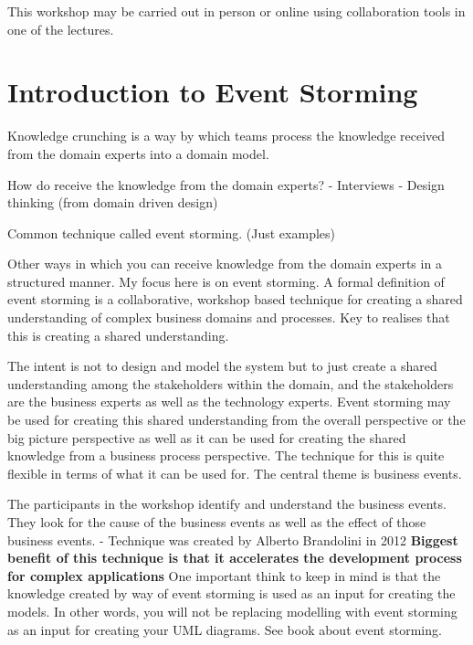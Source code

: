 \documentclass[a4paper, 11pt]{book}
\begin{document}
    This workshop may be carried out in person or online using collaboration tools in one of the lectures.


    \section{Introduction to Event Storming}

    Knowledge crunching is a way by which teams process the knowledge received from the domain experts into a domain model.

    How do receive the knowledge from the domain experts?
    - Interviews
    - Design thinking (from domain driven design)

    Common technique called event storming. (Just examples)

    Other ways in which you can receive knowledge from the domain experts in a structured manner.
    My focus here is on event storming.
    A formal definition of event storming is a collaborative, workshop based technique for creating a shared understanding of complex business domains and processes.
    Key to realises that this is creating a shared understanding.

    The intent is not to design and model the system but to just create a shared understanding among the stakeholders within the domain, and the stakeholders are the business experts as well as the technology experts.
    Event storming may be used for creating this shared understanding from the overall perspective or the big picture perspective as well as it can be used for creating the shared knowledge from a business process perspective.
    The technique for this is quite flexible in terms of what it can be used for.
    The central theme is business events.

    The participants in the workshop identify and understand the business events.
    They look for the cause of the business events as well as the effect of those business events.
    - Technique was created by Alberto Brandolini in 2012 %
    \textbf{Biggest benefit of this technique is that it accelerates the development process for complex applications}
    One important think to keep in mind is that the knowledge created by way of event storming is used as an input for creating the models.
    In other words, you will not be replacing modelling with event storming as an input for creating your UML diagrams. See book about event storming.
\end{document}

